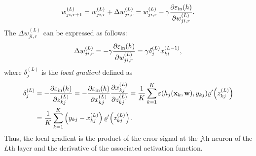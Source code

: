 \begin{equation}
w_{ji,r+1}^{(L)}=w_{ji,r}^{(L)}+\Delta w_{ji,r}^{(L)}=w_{ji,r}^{(L)}-\gamma\frac{\partial \varepsilon_{\mathrm{in}}(h)}{\partial w_{ji,r}^{(L)}}.
\end{equation}
The $\Delta w_{ji,r}^{(L)}$ can be expressed as follows:
\begin{equation}
\Delta w_{ji,r}^{(L)}=-\gamma\frac{\partial \varepsilon_{\mathrm{in}}(h)}{\partial w_{ji,r}^{(L)}}=\gamma\delta_{j}^{(L)}x_{ki}^{(L-1)},
\end{equation}
where $\delta_{j}^{(L)}$ is the \textit{local gradient} defined as
\begin{align}
\delta_{j}^{(L)}&=-\frac{\partial \varepsilon_{\mathrm{in}}(h)}{\partial z_{kj}^{(L)}}=-\frac{\partial \varepsilon_{\mathrm{in}}(h)}{\partial x_{kj}^{(L)}}\frac{\partial x_{kj}^{(L)}}{\partial z_{kj}^{(L)}}=\frac{1}{K}\sum_{k=1}^{K}\varepsilon(h_j(\mathbf{x}_k,\mathbf{w}),y_{kj})\varrho'\!\left(z_{kj}^{(L)}\right)\nonumber\\
&=\frac{1}{K}\sum_{k=1}^{K}\left(y_{kj}-x_{kj}^{(L)}\right)\varrho'\!\left(z_{kj}^{(L)}\right).
\end{align}
Thus, the local gradient is the product of the error signal at the $j$th neuron of the $L$th layer and the derivative of the associated activation function.

